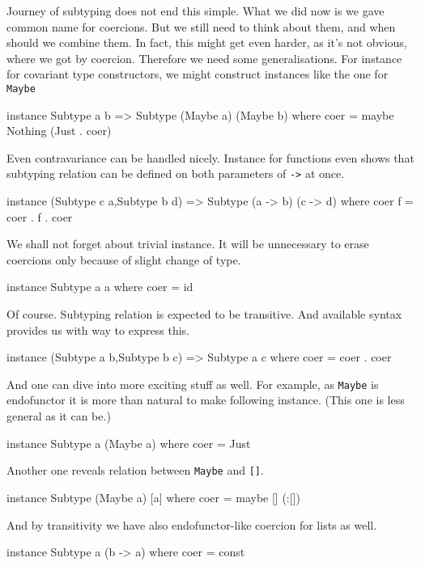 \documentclass[11pt,oneside,draft]{fithesis2}
\theoremstyle{definition}
\begin{document}
Journey of subtyping does not end this simple. What we did now
is we gave common name for coercions. But we still need to
think about them, and when should we combine them.
In fact, this might get even harder, as it's not
obvious, where we got by coercion. Therefore we need
some generalisations. For instance for covariant type
constructors, we might construct instances like the
one for \texttt{Maybe}

\begin{code}
instance Subtype a b => Subtype (Maybe a) (Maybe b) where
    coer = maybe Nothing (Just . coer)
\end{code}

Even contravariance can be handled nicely. Instance for functions
even shows that subtyping relation can be defined on both parameters
of \texttt{->} at once.
\begin{code}
instance (Subtype c a,Subtype b d)
    => Subtype (a -> b) (c -> d) where
        coer f = coer . f . coer
\end{code}

We shall not forget about trivial instance. It will be unnecessary
to erase coercions only because of slight change of type.
\begin{code}
instance Subtype a a where
    coer = id
\end{code}

Of course. Subtyping relation is expected to be transitive.
And available syntax provides us with way to express this.
\begin{code}
instance (Subtype a b,Subtype b c) => Subtype a c where
    coer = coer . coer
\end{code}

And one can dive into more exciting stuff as well. For example,
as \texttt{Maybe} is endofunctor it is more than natural to make following instance.
(This one is less general as it can be.)
\begin{code}
instance Subtype a (Maybe a) where
    coer = Just
\end{code}

Another one reveals relation between \texttt{Maybe} and \texttt{[]}.
\begin{code}
instance Subtype (Maybe a) [a] where
    coer = maybe [] (:[])
\end{code}
And by transitivity we have also endofunctor-like coercion for lists as well.

\begin{code}
instance Subtype a (b -> a) where
    coer = const
\end{code}
\end{document}
